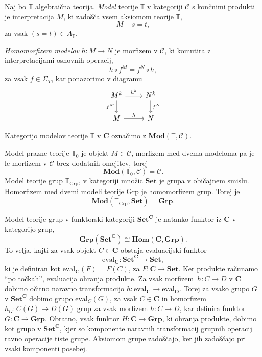 \documentclass[../kategoricna_logika.tex]{subfiles}
\begin{document}
%
\begin{definicija}
Naj bo $\mathbb{T}$ algebraična teorija.
\emph{Model} teorije $\mathbb{T}$ v kategoriji $\mathcal{C}$ s
končnimi produkti je interpretacija $M$, ki zadošča vsem aksiomom
teorije $\mathbb{T}$,
$$M \models s = t,$$
za vsak $(s = t) \in A_\mathbb{T}$.
\end{definicija}
%
\begin{definicija}
 \emph{Homomorfizem modelov} $h : M \to N$ je morfizem v
 $\mathcal{C}$, ki komutira z interpretacijami osnovnih operacij,
$$h \circ f^M = f^N \circ h,$$
za vsak $f \in \Sigma_T$, kar ponazorimo v diagramu
\begin{equation*}
  \begin{tikzcd}
    M^k \ar[d, "f^M"'] \ar[r, "h^k"] & N^k \ar[d, "f^N"] \\
    M \ar[r, "h"] & N
  \end{tikzcd}
\end{equation*}
\end{definicija}
%
Kategorijo modelov teorije $\mathbb{T}$ v $\mathbf{C}$ označimo z
$\mathbf{Mod}(\mathbb{T}, \mathcal{C})$.
%
\begin{primer}
  Model prazne teorije $\mathbb{T}_0$ je objekt $M \in \mathcal{C}$,
  morfizem med dvema modeloma pa je le morfizem v $\mathcal{C}$ brez
  dodatnih omejitev, torej
$$\mathbf{Mod}(\mathbb{T}_0, \mathcal{C}) = \mathcal{C}.$$
%
Model teorije grup $\mathbb{T}_{\mathrm{Grp}}$, v kategoriji množic
$\mathbf{Set}$ je grupa v običajnem smislu. Homorfizem med dvemi modeli
teorije $\mathrm{Grp}$ je homomorfizem grup. Torej je
$$\mathbf{Mod}(\mathbb{T}_{\mathrm{Grp}}, \mathbf{Set}) = \mathbf{Grp}.$$
\end{primer}
% 
\begin{primer}
  Model teorije grup v funktorski kategoriji $\mathbf{Set}^{\mathbf{C}}$ je
  natanko funktor iz $\mathbf{C}$ v kategorijo grup,
  \[ \mathbf{Grp}(\mathbf{Set}^{\mathbf{C}}) \cong \mathbf{Hom}(\mathbf{C}, \mathbf{Grp}). \]
  To velja, kajti za vsak objekt $C \in \mathbf{C}$ obstaja evaluacijski
  funktor
  \[ \mathrm{eval}_{\mathbf{C}} : \mathbf{Set}^{\mathbf{C}} \to \mathbf{Set}, \]
  ki je definiran kot $\mathrm{eval}_{\mathbf{C}}(F) = F(C)$, za $F : \mathbf{C} \to \mathbf{Set}$.
  Ker produkte računamo ``po točkah'', evaluacija ohranja produkte.
  Za vsak morfizem~${h : C \to D}$ v $\mathbf{C}$ dobimo očitno naravno
  transformacijo $h : \mathrm{eval}_{\mathbf{C}} \to \mathrm{eval}_{\mathbf{D}}$.
  Torej za vsako grupo $G$ v $\mathbf{Set}^{\mathbf{C}}$ dobimo grupo
  $\mathrm{eval}_C(G)$, za vsak $C \in \mathbf{C}$ in homorfizem $h_{G} : C(G) \to D(G)$
  grup za vsak morfizem $h : C \to D$, kar definira funktor $G : \mathbf{C} \to \mathbf{Grp}$.
  Obratno, vsak funktor $H : \mathbf{C} \to \mathbf{Grp}$, ki ohranja produkte,
  dobimo kot grupo v $\mathbf{Set}^{\mathbf{C}}$, kjer so komponente
  naravnih transformacij grupnih operacij ravno operacije tiste grupe.
  Aksiomom grupe zadoščajo, ker jih zadoščajo pri vsaki komponenti posebej.
\end{primer}
%
\end{document}
